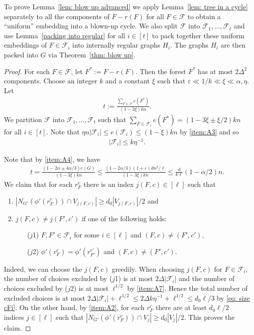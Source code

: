 \documentclass[a4paper, 11pt, reqno]{amsart}
\numberwithin{equation}{section}
\newcommand{\1}{{\rm 1\hspace*{-0.4ex}%
\rule{0.1ex}{1.52ex}\hspace*{0.2ex}}}
\newcommand{\cF}{\mathcal{F}}
\renewcommand{\epsilon}{\varepsilon}
\newcommand{\COMMENT}[1]{}
\begin{document}
To prove Lemma~\ref{lem: blow up advanced} we apply Lemma~\ref{lem: tree in a cycle} separately to all the components of $F-r(F)$ for all $F\in \cF$ to obtain a ``uniform'' embedding into a blown-up cycle. We also split $\cF$ into $\cF_1,\dots,\cF_t$ and use Lemma~\ref{packing into regular} for all $i\in [t]$ to pack together these uniform embeddings of $F\in \cF_i$ into internally regular graphs $H_i$. The graphs $H_i$ are then packed into $G$ via Theorem~\ref{thm: blow up}.
\begin{proof}
For each $F\in \cF$, let $F^*:= F-r(F)$. Then the forest $F^*$ has at most $2\Delta^2$ components. Choose an integer $k$ and a constant $\xi$ such that $\epsilon \ll 1/k \ll \xi \ll \alpha, \eta$. Let 
\begin{align}\label{eq: t def size}
t:= \frac{\sum_{F\in \cF}e(F^*) }{(1-3\xi)k n}.
\end{align}
We partition $\cF$ into $\cF_1,\dots, \cF_t$ such that $\sum_{F\in \cF_i} e(F^*) = (1-3\xi\pm \xi/2)kn$ for all $i\in [t]$. Note that 
$\eta n |\cF_i|\leq e(\cF_i) \leq (1-\xi)kn$ by \ref{item:A3} and so
\begin{align}\label{eq: size cFi}
|\cF_i|\leq k \eta^{-1}.
\end{align}

Note that by \ref{item:A4}, we have\COMMENT{$4\alpha/3$ because of adding roots.}
\begin{align}\label{eq: t play s}
t = \frac{(1-2\alpha\pm 4\alpha/3)e(G)}{(1-3\xi)kn}\leq \frac{ (1-2\alpha/3)(1+\epsilon)dn^2/\ell}{(1-3\xi)kn}\leq \frac{d}{k\ell}(1-\alpha/2)n.
\end{align} 
 We claim that for each $r^c_F$ there is an index $j(F,c)\in [\ell]$ such that
 \begin{enumerate}[label=(\roman*)]
 \item $|N_{G'}(\phi'(r^c_F))\cap V_{j(F,c)}| \geq  d_0|V_{j(F,c)}|/2$ and
 \item $j(F,c)\neq j(F',c')$ if one of the following holds:
 \begin{itemize}
 \item[($j$1)] $F,F'\in \cF_i$ for some $i\in [\ell]$ and $(F,c)\neq (F',c')$,
 \item[($j$2)] $\phi'(r^c_F)=\phi'(r^{c'}_{F'})$ and $(F,c)\neq (F',c')$.
 \end{itemize}
 \end{enumerate}
Indeed, we can choose the $j(F,c)$ greedily. When choosing $j(F,c)$ for $F\in \cF_i$, the number of choices excluded by ($j$1) is at most $2\Delta|\cF_i|$ and the number of choices excluded by ($j$2) is at most $\ell^{1/2}$ by \ref{item:A7}. Hence the total number of excluded choices is at most $2\Delta|\cF_i| + \ell^{1/2} \leq 2\Delta k \eta^{-1} + \ell^{1/2} \leq d_0\ell/3$ by \eqref{eq: size cFi}. On the other hand, by \ref{item:A2}, for each $r^c_F$ there are at least $d_0 \ell/2$ indices $j\in [\ell]$ such that $|N_{G'}(\phi'(r^c_F))\cap V_{j}|\geq d_0 |V_j|/2$. This proves the claim.


\end{proof}
\end{document}
